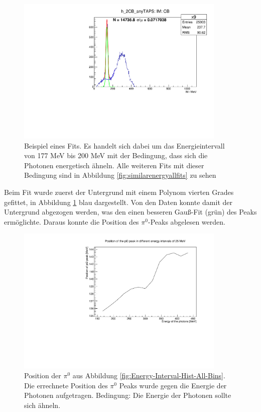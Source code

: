 \documentclass[a4paper,11pt,oneside,final,german,openbib,pdftex]{scrbook}
\begin{document}
{\begin{figure}[h!]
	\begin{center}
		\includegraphics[width=100mm]{fitexampleenergyinterval0903}
		
		\caption{Beispiel eines Fits. Es handelt sich dabei um das Energieintervall von 177 MeV bis 200 MeV mit der Bedingung, dass sich die Photonen energetisch \"ahneln. Alle weiteren Fits mit dieser Bedingung sind in Abbildung \ref{fig:similarenergyallfits} zu sehen}
		\label{fig:fitexampleenergyinterval0903}	
\end{center}
\end{figure}
 Beim Fit wurde zuerst der Untergrund mit einem Polynom vierten Grades gefittet, in Abbildung \ref{fig:fitexampleenergyinterval0903} blau dargestellt. Von den Daten konnte damit der Untergrund abgezogen werden, was den einen besseren Gauß-Fit (grün) des Peaks ermöglichte. Daraus konnte die Position des $\pi^0$-Peaks abgelesen werden. 
 
 \begin{figure}[h!]
 	\begin{center}
 		\includegraphics[width=100mm]{energydependency0903}
 	
 		\caption{Position der $\pi^0$ aus Abbildung \ref{fig:Energy-Interval-Hist-All-Bins}. Die errechnete Position des $\pi^0$ Peaks wurde gegen die Energie der Photonen aufgetragen.
 			Bedingung: Die Energie der Photonen sollte sich \"ahneln.
 		} 
 		\label{fig.Energydependency_pion}
 	\end{center}
 \end{figure}

}
\end{document}
